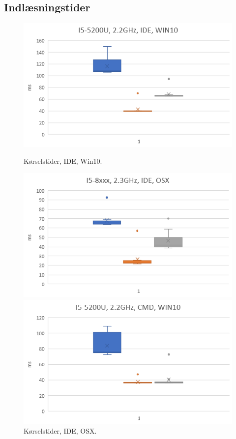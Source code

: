 \documentclass{article}
\begin{document}
\subsection{Indlæsningstider}
    \begin{figure}[htb]
        \begin{minipage}[t]{.5\textwidth}
            \centering
            \includegraphics[width=\textwidth]{images/win10idekmh.PNG}
            \caption{Kørselstider, IDE, Win10.}\label{fig:3}
        \end{minipage}
        \hfill
        \begin{minipage}[t]{.5\textwidth}
            \centering
            \includegraphics[width=\textwidth]{images/osxidekmh.PNG}
            \caption{Kørselstider, IDE, OSX.}\label{fig:4}
        \end{minipage}
        \hfill
        \begin{minipage}[t]{.5\textwidth}
            \centering
            \includegraphics[width=\textwidth]{images/win10cmdkmh.PNG}

\end{minipage}
\end{figure}
\end{document}
